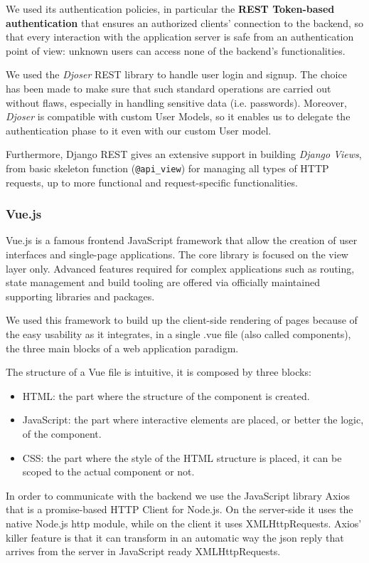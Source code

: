 \documentclass[table, 12pt]{article}
\begin{document}
We used its authentication policies, in particular the \textbf{REST Token-based authentication} that ensures an authorized clients' connection to the backend, so that every interaction with the application server is safe from an authentication point of view: unknown users can access none of the backend's functionalities.

We used the \emph{Djoser} REST library to handle user login and signup. The choice has been made to make sure that such standard operations are carried out without flaws, especially in handling sensitive data (i.e. passwords). Moreover, \emph{Djoser} is compatible with custom User Models, so it enables us to delegate the authentication phase to it even with our custom User model.

Furthermore, Django REST gives an extensive support in building \emph{Django Views}, from basic skeleton function (\texttt{@api\_view}) for managing all types of HTTP requests, up to more functional and request-specific functionalities.

\subsubsection{Vue.js}
\label{Vue}
Vue.js is a famous frontend JavaScript framework that allow the creation of user interfaces and single-page applications.
The core library is focused on the view layer only.
Advanced features required for complex applications such as routing, state management and build tooling are offered via officially maintained supporting libraries and packages.

We used this framework to build up the client-side rendering of pages because of the easy usability as it integrates, in a single .vue file (also called components),
the three main blocks of a web application paradigm.

The structure of a Vue file is intuitive, it is composed by three blocks:
\begin{itemize}
    \item HTML: the part where the structure of the component is created.
    \item JavaScript: the part where interactive elements are placed, or better the logic, of the component.
    \item CSS: the part where the style of the HTML structure is placed, it can be scoped to the actual component or not.
\end{itemize}
In order to communicate with the backend we use the JavaScript library Axios that is a promise-based HTTP Client for Node.js.
On the server-side it uses the native Node.js http module, while on the client it uses XMLHttpRequests.
Axios' killer feature is that it can transform in an automatic way the json reply that arrives from the server in JavaScript ready XMLHttpRequests.
\end{document}
